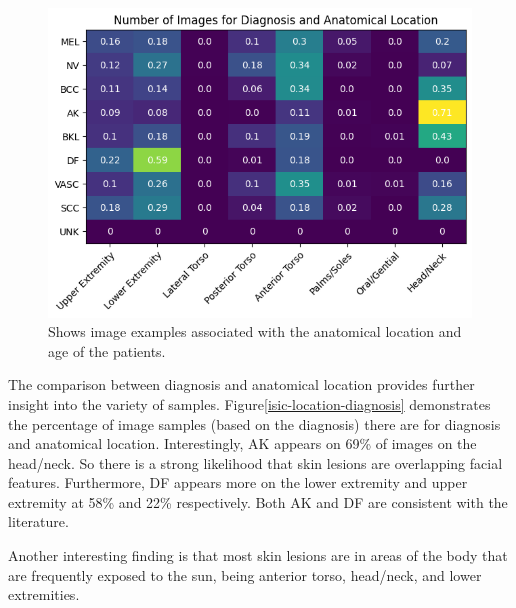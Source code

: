 
\begin{figure}
	\centering
	\includegraphics[scale=0.75]{images/ISIC/isic-location-diagnosis.png}
	\caption{Shows image examples associated with the anatomical location and age of the patients.}
\end{figure}\label{isic-location-diagnosis}

The comparison between diagnosis and anatomical location provides further insight into the variety of samples. Figure\ref{isic-location-diagnosis} demonstrates the percentage of image samples (based on the diagnosis) there are for diagnosis and anatomical location. Interestingly, AK appears on 69\% of images on the head/neck. So there is a strong likelihood that skin lesions are overlapping facial features. Furthermore, DF appears more on the lower extremity and upper extremity at 58\% and 22\% respectively. Both AK and DF are consistent with the literature\cite{}.

Another interesting finding is that most skin lesions are in areas of the body that are frequently exposed to the sun, being anterior torso, head/neck, and lower extremities.

